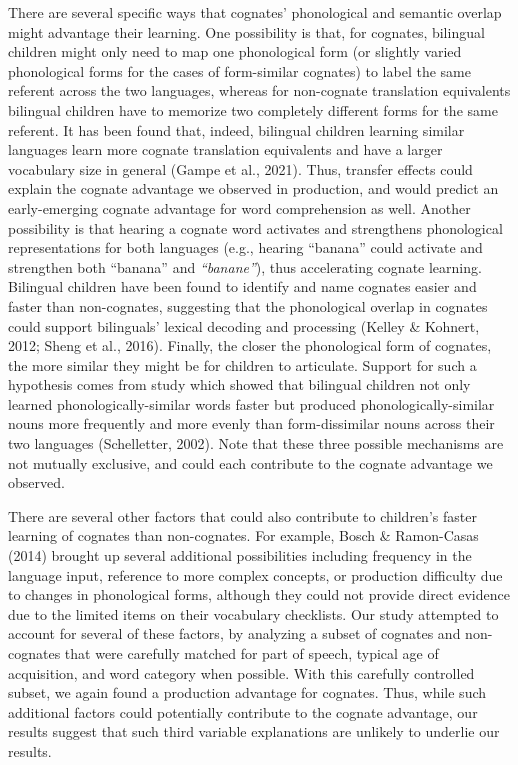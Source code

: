 \documentclass[
  english,
  ,man,floatsintext]{apa6}
\begin{document}
There are several specific ways that cognates' phonological and semantic overlap might advantage their learning. One possibility is that, for cognates, bilingual children might only need to map one phonological form (or slightly varied phonological forms for the cases of form-similar cognates) to label the same referent across the two languages, whereas for non-cognate translation equivalents bilingual children have to memorize two completely different forms for the same referent. It has been found that, indeed, bilingual children learning similar languages learn more cognate translation equivalents and have a larger vocabulary size in general (Gampe et al., 2021). Thus, transfer effects could explain the cognate advantage we observed in production, and would predict an early-emerging cognate advantage for word comprehension as well. Another possibility is that hearing a cognate word activates and strengthens phonological representations for both languages (e.g., hearing ``banana'' could activate and strengthen both ``banana'' and \emph{``banane''}), thus accelerating cognate learning. Bilingual children have been found to identify and name cognates easier and faster than non-cognates, suggesting that the phonological overlap in cognates could support bilinguals' lexical decoding and processing (Kelley \& Kohnert, 2012; Sheng et al., 2016). Finally, the closer the phonological form of cognates, the more similar they might be for children to articulate. Support for such a hypothesis comes from study which showed that bilingual children not only learned phonologically-similar words faster but produced phonologically-similar nouns more frequently and more evenly than form-dissimilar nouns across their two languages (Schelletter, 2002). Note that these three possible mechanisms are not mutually exclusive, and could each contribute to the cognate advantage we observed.

There are several other factors that could also contribute to children's faster learning of cognates than non-cognates. For example, Bosch \& Ramon-Casas (2014) brought up several additional possibilities including frequency in the language input, reference to more complex concepts, or production difficulty due to changes in phonological forms, although they could not provide direct evidence due to the limited items on their vocabulary checklists. Our study attempted to account for several of these factors, by analyzing a subset of cognates and non-cognates that were carefully matched for part of speech, typical age of acquisition, and word category when possible. With this carefully controlled subset, we again found a production advantage for cognates. Thus, while such additional factors could potentially contribute to the cognate advantage, our results suggest that such third variable explanations are unlikely to underlie our results.
\end{document}
